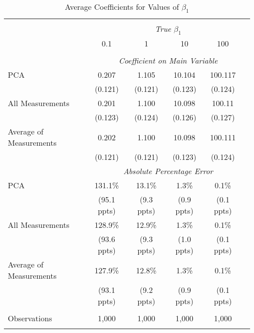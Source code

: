 \begin{table}[!htbp] \centering
  \caption{Average Coefficients for Values of $\beta_1$ \label{sim_beta1_3}}
\begin{tabular}{@{\extracolsep{5pt}}lccccc}
\\[-1.8ex]\hline
\hline \\[-1.8ex]
& \multicolumn{5}{c}{\textit{True $\beta_1$}} \
\cr 
\\[-1.8ex] & 0.1 & 1 & 10 & 100 \\
\hline \\[-1.8ex]
& \multicolumn{5}{c}{\textit{Coefficient on Main Variable}} \\
 PCA & 0.207 & 1.105 & 10.104 & 100.117  \\
  & (0.121) & (0.121) & (0.123) & (0.124)\\
 All Measurements & 0.201 & 1.100 & 10.098 & 100.11  \\
  & (0.123) & (0.124) & (0.126) & (0.127)\\
 Average of Measurements & 0.202 & 1.100 & 10.098 & 100.111  \\
  & (0.121) & (0.121) & (0.123) & (0.124)\\
& \multicolumn{5}{c}{\textit{Absolute Percentage Error}} \\
  PCA & 131.1\% & 13.1\% & 1.3\% & 0.1\%  \\
   & (95.1 ppts) & (9.3 ppts) & (0.9 ppts) & (0.1 ppts)\\
All Measurements & 128.9\% & 12.9\% & 1.3\% & 0.1\%  \\
  & (93.6 ppts) & (9.3 ppts) & (1.0 ppts) & (0.1 ppts)\\
  Average of Measurements & 127.9\% & 12.8\% & 1.3\% & 0.1\%  \\
  & (93.1 ppts) & (9.2 ppts) & (0.9 ppts) & (0.1 ppts)\\
\hline \\[-1.8ex]
 Observations & 1,000 & 1,000 & 1,000 & 1,000 &\\
\hline
\hline \\[-1.8ex]
\end{tabular}
\end{table}